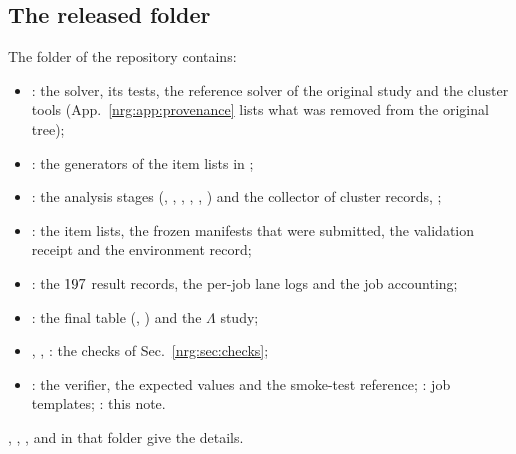 \subsection{The released folder}
The  folder of the repository contains:
\begingroup\raggedright
\begin{itemize}
\item {}: the solver, its tests, the reference solver of the original study and the cluster tools
  (App.~\ref{nrg:app:provenance} lists what was removed from the original tree);
\item {}: the generators of the item lists in ;
\item {}: the analysis stages (, ,
  , , , ) and the
  collector of cluster records, ;
\item {}: the item lists, the frozen manifests that were submitted, the validation receipt and the environment record;
\item {}: the $197$ result records, the per-job lane logs and the job accounting;
\item {}: the final table (, ) and the $\Lambda$ study;
\item {}, , : the checks of Sec.~\ref{nrg:sec:checks};
\item {}: the verifier, the expected values and the smoke-test reference; : job templates; : this
  note.
\end{itemize}
\endgroup
\noindent{}, , ,  and  in that folder give the details.

